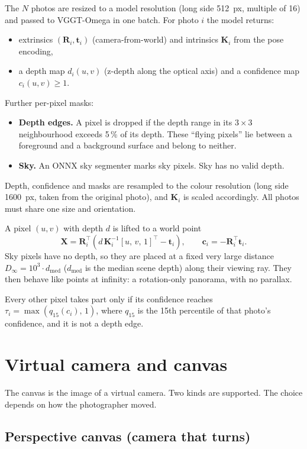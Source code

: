 \documentclass[11pt, a4paper]{article}
\newcommand{\R}{\mathbf{R}}
\newcommand{\X}{\mathbf{X}}
\newcommand{\bt}{\mathbf{t}}
\newcommand{\bc}{\mathbf{c}}
\begin{document}
The $N$ photos are resized to a model resolution (long side 512~px, multiple of 16) and passed to VGGT-Omega
in one batch. For photo $i$ the model returns:
\begin{itemize}
  \item extrinsics $(\R_i, \bt_i)$ (camera-from-world) and intrinsics $\mathbf{K}_i$ from the pose encoding,
  \item a depth map $d_i(u,v)$ (z-depth along the optical axis) and a confidence map $c_i(u,v) \ge 1$.
\end{itemize}
Further per-pixel masks:
\begin{itemize}
  \item \textbf{Depth edges.} A pixel is dropped if the depth range in its $3\times3$ neighbourhood exceeds 5\,\%
        of its depth. These ``flying pixels'' lie between a foreground and a background surface and
        belong to neither.
  \item \textbf{Sky.} An ONNX sky segmenter marks sky pixels. Sky has no valid depth.
\end{itemize}
Depth, confidence and masks are resampled to the colour resolution (long side 1600~px, taken from the
original photo), and $\mathbf{K}_i$ is scaled accordingly. All photos must share one size and orientation.

A pixel $(u,v)$ with depth $d$ is lifted to a world point
\begin{equation}
  \X = \R_i^{\top}\!\left( d\,\mathbf{K}_i^{-1}[u,\,v,\,1]^{\top} - \bt_i \right),
  \qquad \bc_i = -\R_i^{\top}\bt_i .
\end{equation}
Sky pixels have no depth, so they are placed at a fixed very large distance $D_\infty = 10^3 \cdot d_{\mathrm{med}}$
($d_{\mathrm{med}}$ is the median scene depth) along their viewing ray. They then behave like points at infinity:
a rotation-only panorama, with no parallax.

Every other pixel takes part only if its confidence reaches $\tau_i = \max(q_{15}(c_i),\,1)$, where $q_{15}$ is the 15th
percentile of that photo's confidence, and it is not a depth edge.

\section{Virtual camera and canvas}

The canvas is the image of a virtual camera. Two kinds are supported. The choice depends on how the
photographer moved.

\subsection{Perspective canvas (camera that turns)}
\end{document}
